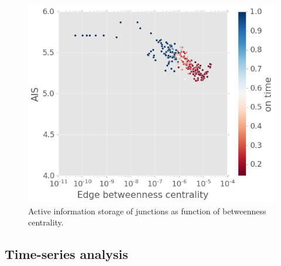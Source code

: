 \documentclass[fleqn,10pt,  amsmath,amssymb,aps]{wlscirep}
\begin{document}
\begin{figure}[h]
	\centering
	\includegraphics[width=0.5\linewidth]{figure/EC_AIS.png}
	\caption{Active information storage of junctions as function of betweenness centrality.}
	\label{fig:EC_AIS}
\end{figure}




\subsection*{Time-series analysis}
\end{document}
